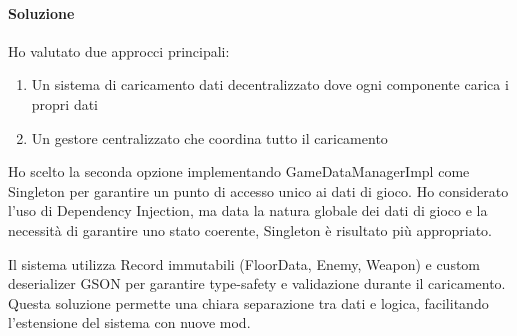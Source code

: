 \documentclass[a4paper,12pt]{report}
\begin{document}
\paragraph{Soluzione} Ho valutato due approcci principali:
\begin{enumerate}
    \item Un sistema di caricamento dati decentralizzato dove ogni componente carica i propri dati
    \item Un gestore centralizzato che coordina tutto il caricamento
\end{enumerate}
Ho scelto la seconda opzione implementando GameDataManagerImpl come Singleton per garantire un punto di accesso unico ai dati di gioco. Ho considerato l'uso di Dependency Injection, ma data la natura globale dei dati di gioco e la necessità di garantire uno stato coerente, Singleton è risultato più appropriato.

Il sistema utilizza Record immutabili (FloorData, Enemy, Weapon) e custom deserializer GSON per garantire type-safety e validazione durante il caricamento. Questa soluzione permette una chiara separazione tra dati e logica, facilitando l'estensione del sistema con nuove mod.
\end{document}
